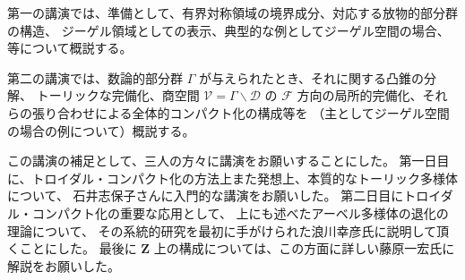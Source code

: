 \documentclass[uplatex,dvipdfmx]{jlreq}
\begin{document}
\bigskip

第一の講演では、準備として、有界対称領域の境界成分、対応する放物的部分群の構造、
ジーゲル領域としての表示、典型的な例としてジーゲル空間の場合、等について概説する。

第二の講演では、数論的部分群 $\Gamma$ が与えられたとき、それに関する凸錐の分解、
トーリックな完備化、商空間 $\mathcal{V} = \Gamma \backslash \mathcal{D}$ の
$\mathcal{F}$ 方向の局所的完備化、それらの張り合わせによる全体的コンパクト化の構成等を
（主としてジーゲル空間の場合の例について）概説する。

\bigskip

この講演の補足として、三人の方々に講演をお願いすることにした。
第一日目に、トロイダル・コンパクト化の方法上また発想上、本質的なトーリック多様体について、
石井志保子さんに入門的な講演をお願いした。
第二日目にトロイダル・コンパクト化の重要な応用として、
上にも述べたアーベル多様体の退化の理論について、
その系統的研究を最初に手がけられた浪川幸彦氏に説明して頂くことにした。
最後に $\mathbf{Z}$ 上の構成については、この方面に詳しい藤原一宏氏に解説をお願いした。
\end{document}
